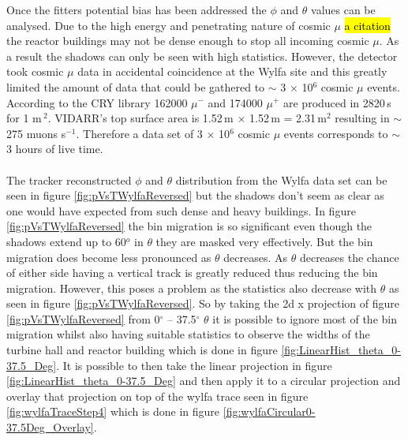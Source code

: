 Once the fitters potential bias has been addressed the $\phi$ and $\theta$ values can be analysed. Due to the high energy and penetrating nature of cosmic $\mu$ \hl{a citation} the reactor buildings may not be dense enough to stop all incoming cosmic $\mu$. As a result the shadows can only be seen with high statistics. However, the detector took cosmic $\mu$ data in accidental coincidence at the Wylfa site and this greatly limited the amount of data that could be gathered to $\sim$ 3 $\times$ 10$^6$ cosmic $\mu$ events. According to the CRY library \cite{ieee_cry_2007} 162000 $\mu^-$ and 174000 $\mu^+$ are produced in 2820\,s for 1 m\,$^2$. VIDARR's top surface area is 1.52\,m $\times$ 1.52\,m = 2.31\,m$^2$ resulting in $\sim$ 275 muons s$^{-1}$. Therefore a data set of 3 $\times$ 10$^6$ cosmic $\mu$ events corresponds to $\sim$ 3 hours of live time. 
\\\\The tracker reconstructed $\phi$ and $\theta$ distribution from the Wylfa data set can be seen in figure \ref{fig:pVsTWylfaReversed} but the shadows don't seem as clear as one would have expected from such dense and heavy buildings. In figure \ref{fig:pVsTWylfaReversed} the bin migration is so significant even though the shadows extend up to 60$^o$ in $\theta$ they are masked very effectively. But the bin migration does become less pronounced as $\theta$ decreases. As $\theta$ decreases the chance of either side having a vertical track is greatly reduced thus reducing the bin migration. However, this poses a problem as the statistics also decrease with $\theta$ as seen in figure \ref{fig:pVsTWylfaReversed}. So by taking the 2d x projection of figure \ref{fig:pVsTWylfaReversed} from 0$^\circ$ -- 37.5$^\circ$ $\theta$ it is possible to ignore most of the bin migration whilst also having suitable statistics to observe the widths of the turbine hall and reactor building which is done in figure \ref{fig:LinearHist_theta_0-37.5_Deg}. It is possible to then take the linear projection in figure \ref{fig:LinearHist_theta_0-37.5_Deg} and then apply it to a circular projection and overlay that projection on top of the wylfa trace seen in figure \ref{fig:wylfaTraceStep4} which is done in figure \ref{fig:wylfaCircular0-37.5Deg_Overlay}. 

